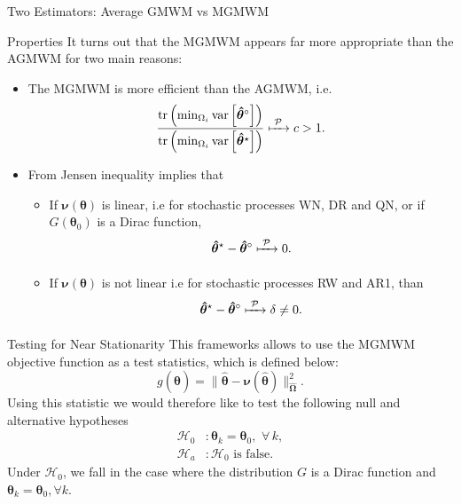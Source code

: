 \documentclass[envcountsect,usenames,dvipsnames]{beamer}
\DeclareMathOperator*{\var}{var}
\DeclareMathOperator*{\tr}{tr}
\def\btheta{\bm \theta}
\theoremstyle{mystyle}
\begin{document}
\begin{frame}{Two Estimators: Average GMWM vs MGMWM}
\footnotesize
\begin{block}{Properties}
It turns out that the MGMWM appears far more appropriate than the AGMWM for two main reasons:
%
\begin{itemize}
    \item  The MGMWM is more efficient than the AGMWM, i.e.
    \begin{equation*}
        \frac{\tr\left( \min_{\Omega_{i}} \var\left[\bm{\hat{\theta}}^{\circ}\right] \right)}{\tr\left( \min_{\Omega_{i}} \var\left[\bm{\hat{\theta}}^{\star}\right] \right)} \xmapsto[\;\;\;\;\; ]{\mathcal{P}} c > 1.
    \end{equation*}
\item From Jensen inequality implies that
    \begin{itemize}
        \item If $\bm{\nu(\btheta)}$ is linear, i.e for stochastic processes WN, DR and QN, or if $G(\btheta_0)$ is a Dirac function,
        \begin{equation*}
            \bm{\hat{\theta}}^{\star} -  \bm{\hat{\theta}}^{\circ}  \xmapsto[\;\;\;\;\; ]{\mathcal{P}}  0.
        \end{equation*}
        \item If $\bm{\nu(\btheta)}$ is not linear i.e for stochastic processes RW and AR1, than
        \begin{equation*}
            \bm{\hat{\theta}}^{\star} - \bm{\hat{\theta}}^{\circ} \xmapsto[\;\;\;\;\; ]{\mathcal{P}}  \delta \neq 0.
        \end{equation*}
    \end{itemize}
\end{itemize}
   
    
\end{block}
    
\end{frame}

\begin{frame}{Testing for Near Stationarity}
This frameworks allows to use the MGMWM objective function as a test statistics, which is defined below:
    \begin{equation*}
	    g(\hat{\btheta}) = \| \hat{\btheta} - {\bm{\nu}}(\hat{\btheta})\|^2_{\hat{\bm{\Omega}}}.
    \end{equation*}
%
Using this statistic we would therefore like to test the following null and alternative hypotheses
%
\begin{equation*}
	\begin{aligned}
		\mathcal{H}_0 &: \btheta_k = \btheta_0,  \,\, \forall \, k,\\
		\mathcal{H}_a &: \mathcal{H}_0 \,\, \text{is false} .
	\end{aligned}
\end{equation*}
%
Under $\mathcal{H}_0$, we fall in the case where {\color{beamer@myorange}the distribution $G$ is a Dirac function} and $ \btheta_k = \btheta_0, \forall k$. 
\end{frame}
\end{document}
